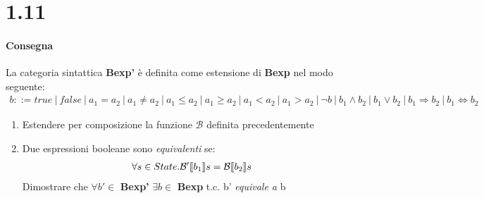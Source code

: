 \section{1.11}
\paragraph{Consegna} 
La categoria sintattica \textbf{Bexp'} è definita come estensione di 
\textbf{Bexp} nel modo seguente:
\begin{align*}
b ::= true \
| \ false \ 
| \ a_1 = a_2 \
| \ a_1 \not = a_2 \
| \ a_1 \leq a_2 \
| \ a_1 \geq a_2 \
| \ a_1 < a_2 \
| \ a_1 > a_2 \
| \ \lnot b \
| \ b_1 \land b_2 \
| \ b_1 \lor b_2 \
| \ b_1 \Rightarrow b_2 \
| \ b_1 \Leftrightarrow b_2    
\end{align*}
\begin{enumerate}[label=(\alph*)]
  \item Estendere per composizione la funzione $\mathcal{B}$ definita 
precedentemente
  \item Due espressioni booleane sono \textit{equivalenti} se:  
    \begin{align*}
      \forall s \in State.\mathcal{B'} \llbracket b_1 \rrbracket s = \mathcal{B} \llbracket b_2 \rrbracket s
    \end{align*}
    Dimostrare che $\forall b' \in$ \textbf{Bexp'} $\exists b \in$ 
\textbf{Bexp} t.c. b' \textit{equivale a} b
\end{enumerate}

